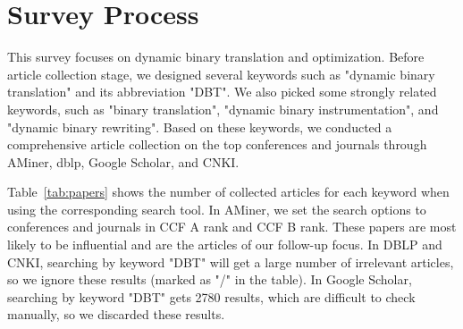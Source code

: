 \section{Survey Process}
\label{sec:process}

This survey focuses on dynamic binary translation and optimization. 
Before article collection stage, we designed several keywords such as "dynamic binary translation" and its abbreviation "DBT".
We also picked some strongly related keywords, such as "binary translation", "dynamic binary instrumentation", and "dynamic binary rewriting".
Based on these keywords, we conducted a comprehensive article collection on the top conferences and journals through AMiner, dblp, Google Scholar, and CNKI.

Table~\ref{tab:papers} shows the number of collected articles for each keyword when using the corresponding search tool.
In AMiner, we set the search options to conferences and journals in CCF A rank and CCF B rank.
These papers are most likely to be influential and are the articles of our follow-up focus.
In DBLP and CNKI, searching by keyword "DBT" will get a large number of irrelevant articles, so we ignore these results (marked as "/" in the table).
In Google Scholar, searching by keyword "DBT" gets 2780 results, which are difficult to check manually, so we discarded these results.

\begin{table}[!ht]
	\centering
	\caption{The number of collected papers under the given search tool and keyword before filtering.}
	\label{tab:papers}
\end{table}

